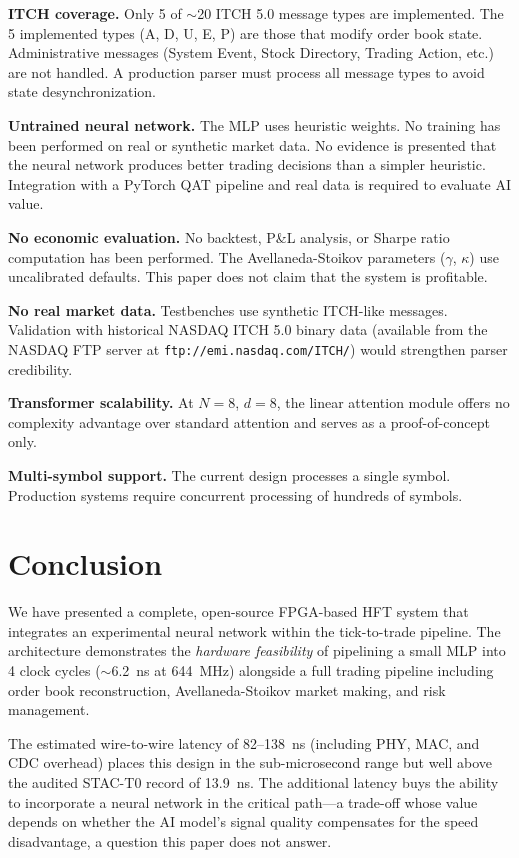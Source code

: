 \documentclass[conference,10pt]{IEEEtran}
\begin{document}
\textbf{ITCH coverage.} Only 5 of $\sim$20 ITCH 5.0 message types are implemented. The 5 implemented types (A, D, U, E, P) are those that modify order book state. Administrative messages (System Event, Stock Directory, Trading Action, etc.) are not handled. A production parser must process all message types to avoid state desynchronization.

\textbf{Untrained neural network.} The MLP uses heuristic weights. No training has been performed on real or synthetic market data. No evidence is presented that the neural network produces better trading decisions than a simpler heuristic. Integration with a PyTorch QAT pipeline and real data is required to evaluate AI value.

\textbf{No economic evaluation.} No backtest, P\&L analysis, or Sharpe ratio computation has been performed. The Avellaneda-Stoikov parameters ($\gamma$, $\kappa$) use uncalibrated defaults. This paper does not claim that the system is profitable.

\textbf{No real market data.} Testbenches use synthetic ITCH-like messages. Validation with historical NASDAQ ITCH 5.0 binary data (available from the NASDAQ FTP server at \texttt{ftp://emi.nasdaq.com/ITCH/}) would strengthen parser credibility.

\textbf{Transformer scalability.} At $N = 8$, $d = 8$, the linear attention module offers no complexity advantage over standard attention and serves as a proof-of-concept only.

\textbf{Multi-symbol support.} The current design processes a single symbol. Production systems require concurrent processing of hundreds of symbols.

\section{Conclusion}
\label{sec:conclusion}

We have presented a complete, open-source FPGA-based HFT system that integrates an experimental neural network within the tick-to-trade pipeline. The architecture demonstrates the \textit{hardware feasibility} of pipelining a small MLP into 4 clock cycles ($\sim$6.2~ns at 644~MHz) alongside a full trading pipeline including order book reconstruction, Avellaneda-Stoikov market making, and risk management.

The estimated wire-to-wire latency of 82--138~ns (including PHY, MAC, and CDC overhead) places this design in the sub-microsecond range but well above the audited STAC-T0 record of 13.9~ns. The additional latency buys the ability to incorporate a neural network in the critical path---a trade-off whose value depends on whether the AI model's signal quality compensates for the speed disadvantage, a question this paper does not answer.
\end{document}
